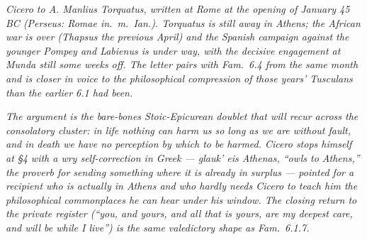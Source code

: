 
\textit{Cicero to A. Manlius Torquatus, written at Rome at the
opening of January 45 BC (Perseus: \textit{Romae in.~m.~Ian.}).
Torquatus is still away in Athens; the African war is over (Thapsus
the previous April) and the Spanish campaign against the
younger Pompey and Labienus is under way, with the decisive
engagement at Munda still some weeks off. The letter pairs with
\textit{Fam.}~6.4 from the same month and is closer in voice to
the philosophical compression of those years' \textit{Tusculans}
than the earlier 6.1 had been.}

\textit{The argument is the bare-bones Stoic-Epicurean doublet
that will recur across the consolatory cluster: in life nothing
can harm us so long as we are without fault, and in death we
have no perception by which to be harmed. Cicero stops himself
at \S 4 with a wry self-correction in Greek --- \textit{glauk'
eis Athenas}, ``owls to Athens,'' the proverb for sending
something where it is already in surplus --- pointed for a
recipient who is actually in Athens and who hardly needs Cicero
to teach him the philosophical commonplaces he can hear under
his window. The closing return to the private register
(``you, and yours, and all that is yours, are my deepest care,
and will be while I live'') is the same valedictory shape as
\textit{Fam.}~6.1.7.}

